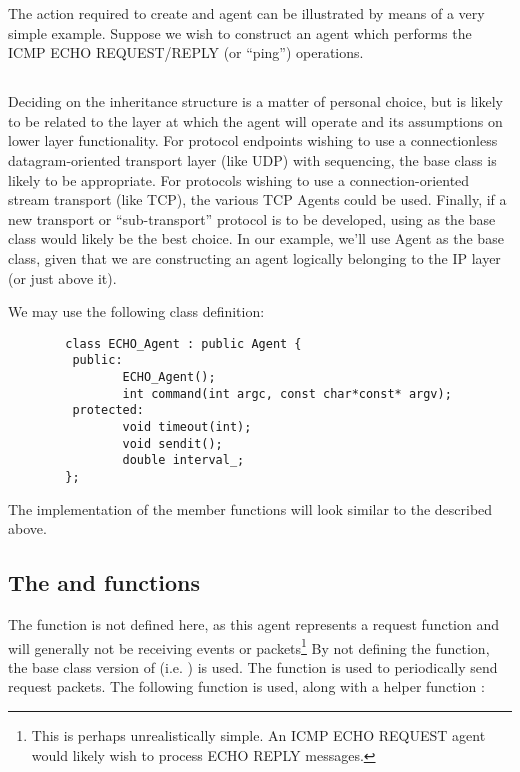 The action required to create and agent can be illustrated
by means of a very simple example.
Suppose we wish to construct an agent which performs
the ICMP ECHO REQUEST/REPLY (or ``ping'') operations.

\subsection{}

Deciding on the inheritance structure is a matter of personal choice, but is
likely to be related to the layer at which the agent will operate
and its assumptions on lower layer functionality.
For protocol endpoints wishing to use a connectionless
datagram-oriented transport layer (like UDP) with sequencing,
the  base class is likely to be appropriate.
For protocols wishing to use a connection-oriented stream transport
(like TCP), the various TCP Agents could be used.
Finally, if a new transport or ``sub-transport'' protocol
is to be developed, using 
as the base class would likely be the best choice.
In our example, we'll use Agent as the base class, given that
we are constructing an agent logically belonging to the IP layer
(or just above it).

We may use the following class definition:
\begin{small}
\begin{verbatim}
        class ECHO_Agent : public Agent {
         public:
                ECHO_Agent();
                int command(int argc, const char*const* argv);
         protected:
                void timeout(int);
                void sendit();
                double interval_;
        };
\end{verbatim}
\end{small}

The implementation of the member functions will look similar to
the  described above.

\subsection{The  and  functions}

The  function is not defined here, as this agent
represents a request function and will generally not be receiving
events or packets\footnote{This is perhaps unrealistically simple.
An ICMP ECHO REQUEST agent would likely wish to process
ECHO REPLY messages.}
By not defining the  function, the base class version
of  (i.e. ) is used.
The  function is used to periodically send request packets.
The following  function is used, along with a helper
function :

